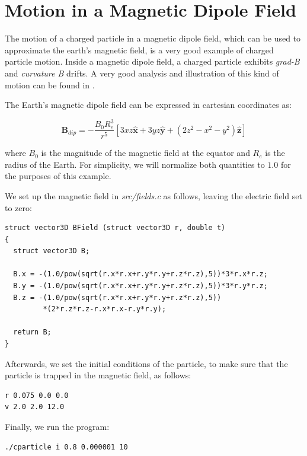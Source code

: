 \documentclass[11pt]{report}
\begin{document}
\newpage

\section{Motion in a Magnetic Dipole Field}
The motion of a charged particle in a magnetic dipole field, which can be used to approximate the earth's magnetic field, is a very good example of charged particle motion. Inside a magnetic dipole field, a charged particle exhibits \emph{grad-B} and \emph{curvature B} drifts. A very good analysis and illustration of this kind of motion can be found in \cite{ozturk}.

The Earth's magnetic dipole field can be expressed in cartesian coordinates as:

\begin{equation}
\bm{B}_{dip} = - \frac{B_0 R_e^3}{r^5}\left[ 3xz \bm{\hat{x}} + 3yz \bm{\hat{y}} + (2z^2 -x^2 -y^2) \bm{\hat{z}} \right]
\end{equation}

where $B_0$ is the magnitude of the magnetic field at the equator and $R_e$ is the radius of the Earth. For simplicity, we will normalize both quantities to $1.0$ for the purposes of this example.
\newline

\newpage
We set up the magnetic field in \emph{src/fields.c} as follows, leaving the electric field set to zero:

\begin{lstlisting}
struct vector3D BField (struct vector3D r, double t)
{
  struct vector3D B;

  B.x = -(1.0/pow(sqrt(r.x*r.x+r.y*r.y+r.z*r.z),5))*3*r.x*r.z;
  B.y = -(1.0/pow(sqrt(r.x*r.x+r.y*r.y+r.z*r.z),5))*3*r.y*r.z;
  B.z = -(1.0/pow(sqrt(r.x*r.x+r.y*r.y+r.z*r.z),5))
  	     *(2*r.z*r.z-r.x*r.x-r.y*r.y);

  return B;
}
\end{lstlisting}

Afterwards, we set the initial conditions of the particle, to make sure that the particle is trapped in the magnetic field, as follows:

\begin{lstlisting}
r 0.075 0.0 0.0
v 2.0 2.0 12.0
\end{lstlisting}

Finally, we run the program:

\begin{lstlisting}
./cparticle i 0.8 0.000001 10
\end{lstlisting}
\end{document}
